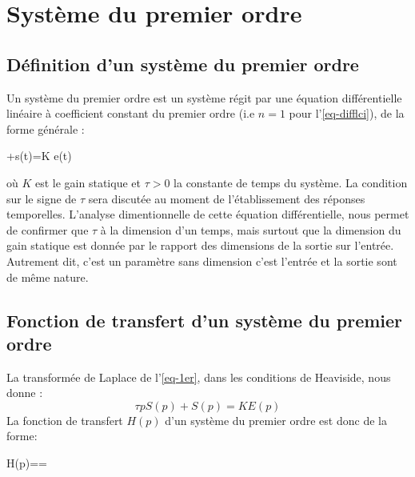 \newpage
\section{Système du premier ordre}

\subsection{Définition d'un système du premier ordre}
Un système du premier ordre est un système régit par une équation
différentielle linéaire à coefficient constant du premier ordre 
(i.e $n=1$ pour l'\cref{eq-difflci}), de la forme générale :
\begin{bequation}
    \tau{}+s(t)=K e(t)\label{eq-1er}
\end{bequation}
où $K$ est le gain statique et $\tau>0$ la constante de 
temps du système. La condition sur le signe de $\tau$ sera 
discutée au moment de l'établissement des réponses temporelles.
L'analyse dimentionnelle de cette équation différentielle, nous permet 
de confirmer que $\tau$ à la dimension d'un temps, mais surtout que 
la dimension du gain statique est donnée par le rapport des dimensions de 
la sortie sur l'entrée. Autrement dit, c'est un paramètre sans dimension 
c'est l'entrée et la sortie sont de même nature.


\subsection{Fonction de transfert d'un système du premier ordre}
La transformée de Laplace de l'\cref{eq-1er}, dans les conditions de 
Heaviside, nous donne :
$$
\tau pS(p)+S(p)=KE(p)
$$
La fonction de transfert $H(p)$ d'un système du premier ordre est 
donc de la forme:
\begin{bequation}
    H(p)==\label{eq-ft1er}
\end{bequation}

